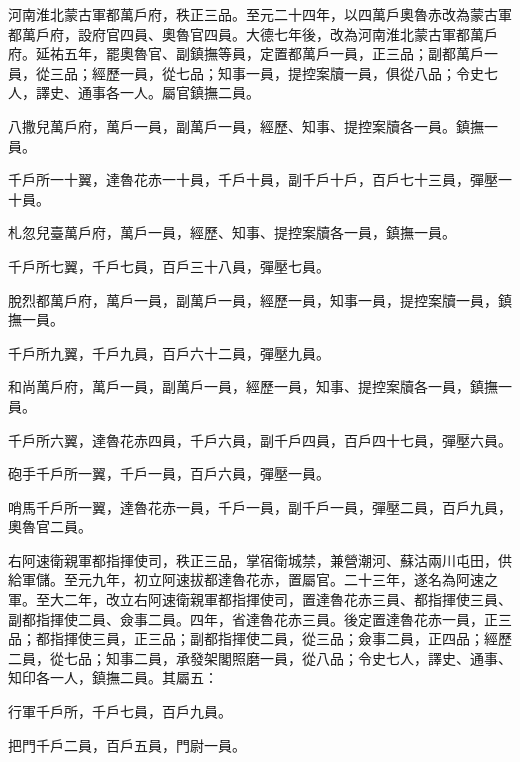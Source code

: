 \begin{pinyinscope}
 河南淮北蒙古軍都萬戶府，秩正三品。至元二十四年，以四萬戶奧魯赤改為蒙古軍都萬戶府，設府官四員、奧魯官四員。大德七年後，改為河南淮北蒙古軍都萬戶府。延祐五年，罷奧魯官、副鎮撫等員，定置都萬戶一員，正三品；副都萬戶一員，從三品；經歷一員，從七品；知事一員，提控案牘一員，俱從八品；令史七人，譯史、通事各一人。屬官鎮撫二員。



 八撒兒萬戶府，萬戶一員，副萬戶一員，經歷、知事、提控案牘各一員。鎮撫一員。



 千戶所一十翼，達魯花赤一十員，千戶十員，副千戶十戶，百戶七十三員，彈壓一十員。



 札忽兒臺萬戶府，萬戶一員，經歷、知事、提控案牘各一員，鎮撫一員。



 千戶所七翼，千戶七員，百戶三十八員，彈壓七員。



 脫烈都萬戶府，萬戶一員，副萬戶一員，經歷一員，知事一員，提控案牘一員，鎮撫一員。



 千戶所九翼，千戶九員，百戶六十二員，彈壓九員。



 和尚萬戶府，萬戶一員，副萬戶一員，經歷一員，知事、提控案牘各一員，鎮撫一員。



 千戶所六翼，達魯花赤四員，千戶六員，副千戶四員，百戶四十七員，彈壓六員。



 砲手千戶所一翼，千戶一員，百戶六員，彈壓一員。



 哨馬千戶所一翼，達魯花赤一員，千戶一員，副千戶一員，彈壓二員，百戶九員，奧魯官二員。



 右阿速衛親軍都指揮使司，秩正三品，掌宿衛城禁，兼營潮河、蘇沽兩川屯田，供給軍儲。至元九年，初立阿速拔都達魯花赤，置屬官。二十三年，遂名為阿速之軍。至大二年，改立右阿速衛親軍都指揮使司，置達魯花赤三員、都指揮使三員、副都指揮使二員、僉事二員。四年，省達魯花赤三員。後定置達魯花赤一員，正三品；都指揮使三員，正三品；副都指揮使二員，從三品；僉事二員，正四品；經歷二員，從七品；知事二員，承發架閣照磨一員，從八品；令史七人，譯史、通事、知印各一人，鎮撫二員。其屬五：



 行軍千戶所，千戶七員，百戶九員。



 把門千戶二員，百戶五員，門尉一員。




\end{pinyinscope}
